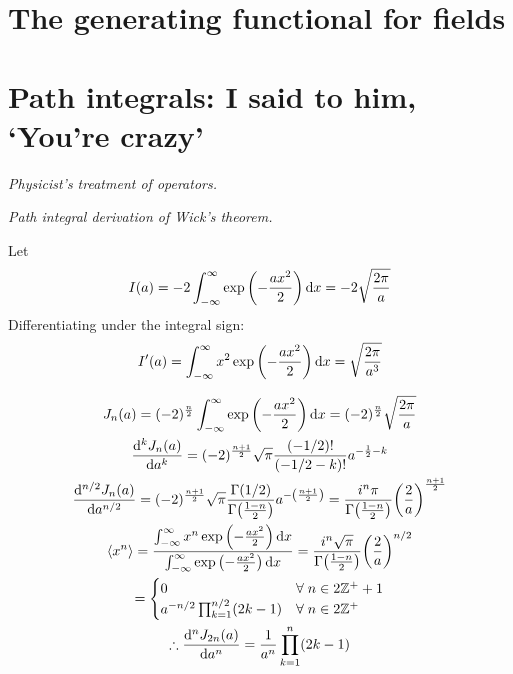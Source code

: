 \documentclass{report}
\begin{document}
\chapter{The generating functional for fields}

\chapter{Path integrals: I said to him, `You're crazy'}

\begin{subquests}
	\item \emph{Physicist's treatment of operators.}

	\item \emph{Path integral derivation of Wick's theorem.}
	\begin{subquests}
		\item Let
		\begin{gather*}
			I(a) = -2\int_{-\infty}^{\infty}\exp\pqty{-\frac{ax^2}{2}} \dd{x} = -2\sqrt{\frac{2\pi}{a}}
		\end{gather*}
		Differentiating under the integral sign:
		\begin{gather*}
			I'(a) = \int_{-\infty}^{\infty}x^2\exp\pqty{-\frac{ax^2}{2}} \dd{x} = \sqrt{\frac{2\pi}{a^3}}
		\end{gather*}

		\item 
		\begin{gather*}
			J_n(a) = (-2)^\frac{n}{2} \int_{-\infty}^{\infty}\exp\pqty{-\frac{ax^2}{2}} \dd{x} = (-2)^{\frac{n}{2}}\sqrt{\frac{2\pi}{a}} \\
			\dv[k]{J_n(a)}{a} = (-2)^{\frac{n+1}{2}}\sqrt{\pi}\frac{(-1/2)!}{(-1/2-k)!}a^{-\frac{1}{2}-k} \\
			\dv[n/2]{J_n(a)}{a} = (-2)^{\frac{n+1}{2}}\sqrt{\pi}\frac{\Gamma(1/2)}{\Gamma\pqty{\frac{1-n}{2}}} a^{-\pqty{\frac{n+1}{2}}} = \frac{i^n \pi}{\Gamma\pqty{\frac{1-n}{2}}}\pqty{\frac{2}{a}}^{\frac{n+1}{2}} \\
			\expval{x^n} = \frac{\int_{-\infty}^{\infty}x^n\exp\pqty{-\frac{ax^2}{2}} \dd{x}}{\int_{-\infty}^{\infty}\exp\pqty{-\frac{ax^2}{2}} \dd{x}} = \frac{i^n \sqrt{\pi}}{\Gamma\pqty{\frac{1-n}{2}}}\pqty{\frac{2}{a}}^{n/2} \\
			= \begin{cases} 0 & \forall\;n \in 2\mathbb{Z^+} + 1 \\ a^{-n/2}\prod_{k = 1}^{n/2}(2k-1) & \forall\;n \in 2\mathbb{Z^+} \end{cases} \\
			\therefore \dv[n]{J_{2n}(a)}{a} = \frac{1}{a^n}\prod_{k=1}^{n}(2k-1)
		\end{gather*}
	\end{subquests}
\end{subquests}
\end{document}
